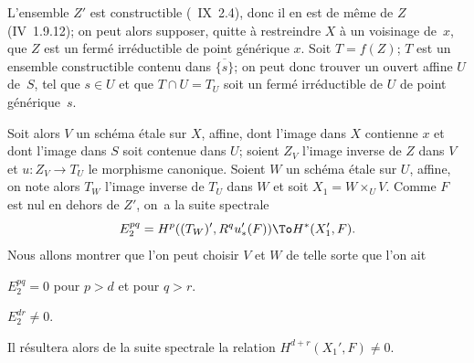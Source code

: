 L'ensemble $Z'$ est constructible (~IX~2.4), donc il en est de m\^eme de $Z$ (\EGA IV~1.9.12); on peut alors supposer, quitte \`a restreindre $X$ \`a un voisinage de~$x$, que $Z$ est un ferm\'e irr\'eductible de point g\'en\'erique $x$. Soit $T=f(Z)$; $T$ est un ensemble constructible contenu dans $\overline{\{s\}}$; on peut donc trouver un ouvert affine $U$ de~$S$, tel que $s \in U$ et que $T \cap U = T_U$ soit un ferm\'e irr\'eductible de $U$ de point g\'en\'erique~$s$.

Soit alors $V$ un sch\'ema \'etale sur $X$, affine, dont l'image dans $X$ contienne $x$ et dont l'image dans $S$ soit contenue dans $U$; soient $Z_V$ l'image inverse de $Z$ dans $V$ et $u: Z_V \to T_U$ le morphisme canonique. Soient $W$ un sch\'ema \'etale sur $U$, affine, on note alors $T_W$ l'image inverse de $T_U$ dans $W$ et soit $X_1 = W\times_U V$. Comme $F$ est nul en dehors de $Z'$, on~a la suite spectrale
$$
E^{pq}_2 = H^p((T_W)', R^qu_*'(F)) \To H^*(X'_1, F).
$$
Nous allons montrer que l'on peut choisir $V$ et $W$ de telle sorte que l'on ait
\begin{enumeratea}
\item
$E^{pq}_2=0$ pour $p>d$ et pour $q>r$.
\item
$E^{dr}_2 \neq 0$.
\end{enumeratea}
\noindent
Il r\'esultera alors de la suite spectrale la relation $H^{d+r}(X_1', F) \neq 0$.
